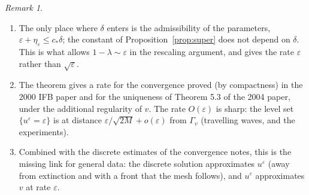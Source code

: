 \documentclass[11pt]{amsart}
\theoremstyle{definition}
\theoremstyle{remark}
\newtheorem{remark}[theorem]{Remark}
\newcommand{\ve}{\varepsilon}
\begin{document}
\begin{remark}
\begin{enumerate}
\item The only place where $\delta$ enters is the admissibility of the
parameters, $\ve+\eta_\ve\le c_*\delta$; the constant of Proposition~\ref{prop:super}
does not depend on $\delta$. This is what allows $1-\lambda\sim\ve$ in the
rescaling argument, and gives the rate $\ve$ rather than $\sqrt\ve$.
\item The theorem gives a rate for the convergence proved (by compactness) in
the 2000 IFB paper and for the uniqueness of Theorem 5.3 of the 2004 paper,
under the additional regularity of $v$. The rate $O(\ve)$ is sharp: the
level set $\{u^\ve=\ve\}$ is at distance $\ve/\sqrt{2M}+o(\ve)$ from $\Gamma_v$
(travelling waves, and the experiments).
\item Combined with the discrete estimates of the convergence notes, this is
the missing link for general data: the discrete solution approximates $u^\ve$
(away from extinction and with a front that the mesh follows), and $u^\ve$
approximates $v$ at rate $\ve$.
\end{enumerate}
\end{remark}
\end{document}

